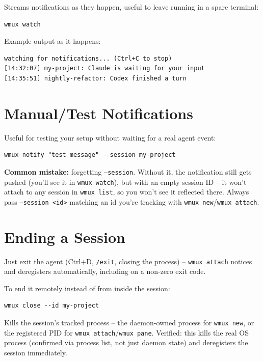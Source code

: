 \documentclass{article}
\begin{document}
Streams notifications as they happen, useful to leave running in a spare terminal:

\begin{lstlisting}
wmux watch
\end{lstlisting}

Example output as it happens:

\begin{lstlisting}
watching for notifications... (Ctrl+C to stop)
[14:32:07] my-project: Claude is waiting for your input
[14:35:51] nightly-refactor: Codex finished a turn
\end{lstlisting}

\section{Manual/Test Notifications}

Useful for testing your setup without waiting for a real agent event:

\begin{lstlisting}
wmux notify "test message" --session my-project
\end{lstlisting}

\textbf{Common mistake:} forgetting \texttt{--session}. Without it, the notification still gets pushed (you'll see it in \texttt{wmux watch}), but with an empty session ID -- it won't attach to any session in \texttt{wmux list}, so you won't see it reflected there. Always pass \texttt{--session <id>} matching an id you're tracking with \texttt{wmux new}/\texttt{wmux attach}.

\section{Ending a Session}

Just exit the agent (Ctrl+D, \texttt{/exit}, closing the process) -- \texttt{wmux attach} notices and deregisters automatically, including on a non-zero exit code.

To end it remotely instead of from inside the session:

\begin{lstlisting}
wmux close --id my-project
\end{lstlisting}

Kills the session's tracked process -- the daemon-owned process for \texttt{wmux new}, or the registered PID for \texttt{wmux attach}/\texttt{wmux pane}. Verified: this kills the real OS process (confirmed via process list, not just daemon state) and deregisters the session immediately.
\end{document}
